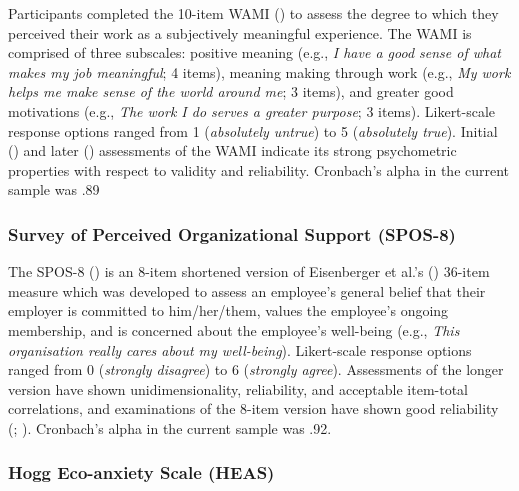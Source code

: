 \documentclass[
  man,
  longtable,
  nolmodern,
  notxfonts,
  notimes,
  colorlinks=true,linkcolor=blue,citecolor=blue,urlcolor=blue]{apa7}
\begin{document}
Participants completed the 10-item WAMI
() to assess
the degree to which they perceived their work as a subjectively
meaningful experience. The WAMI is comprised of three subscales:
positive meaning (e.g., \emph{I have a good sense of what makes my job
meaningful}; 4 items), meaning making through work (e.g., \emph{My work
helps me make sense of the world around me}; 3 items), and greater good
motivations (e.g., \emph{The work I do serves a greater purpose}; 3
items). Likert-scale response options ranged from 1 (\emph{absolutely
untrue}) to 5 (\emph{absolutely true}). Initial
() and later
() assessments
of the WAMI indicate its strong psychometric properties with respect to
validity and reliability. Cronbach's alpha in the current sample was .89

\subsubsection{Survey of Perceived Organizational Support
(SPOS-8)}\label{survey-of-perceived-organizational-support-spos-8}

The SPOS-8 () is an 8-item shortened version of Eisenberger et al.'s
() 36-item measure which
was developed to assess an employee's general belief that their employer
is committed to him/her/them, values the employee's ongoing membership,
and is concerned about the employee's well-being (e.g., \emph{This
organisation really cares about my well-being}). Likert-scale response
options ranged from 0 (\emph{strongly disagree}) to 6 (\emph{strongly
agree}). Assessments of the longer version have shown unidimensionality,
reliability, and acceptable item-total correlations, and examinations of
the 8-item version have shown good reliability
(;
).
Cronbach's alpha in the current sample was .92.

\subsubsection{Hogg Eco-anxiety Scale
(HEAS)}\label{hogg-eco-anxiety-scale-heas}
\end{document}
